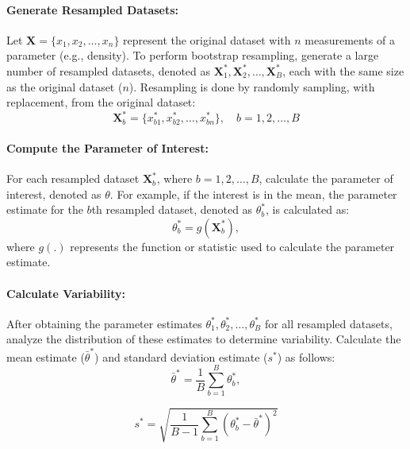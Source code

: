 \documentclass{article}
\begin{document}
\paragraph{Generate Resampled Datasets:}
Let $\mathbf{X} = \{x_1, x_2, \ldots, x_n\}$ represent the original dataset with $n$ measurements of a parameter (e.g., density). To perform bootstrap resampling, generate a large number of resampled datasets, denoted as $\mathbf{X}^{*}_1, \mathbf{X}^{*}_2, \ldots, \mathbf{X}^{*}_B$, each with the same size as the original dataset ($n$). Resampling is done by randomly sampling, with replacement, from the original dataset\cite{Chernick2007BootstrapMA}\cite{davison_hinkley_1997}\cite{Efron1994AnIT}\cite{article}:
\begin{equation}
\mathbf{X}^{*}_b = \{x^{*}_{b1}, x^{*}_{b2}, \ldots, x^{*}_{bn}\}, \quad b = 1, 2, \ldots, B
\end{equation}

\paragraph{Compute the Parameter of Interest:}
For each resampled dataset $\mathbf{X}^{*}_b$, where $b = 1, 2, \ldots, B$, calculate the parameter of interest, denoted as $\theta$. For example, if the interest is in the mean, the parameter estimate for the $b$th resampled dataset, denoted as $\theta^{*}_{b}$, is calculated as\cite{Chernick2007BootstrapMA}\cite{davison_hinkley_1997}\cite{Efron1994AnIT}\cite{article}:
\begin{equation}
\theta^{*}_{b} = g(\mathbf{X}^{*}_b),
\end{equation}
where $g(.)$ represents the function or statistic used to calculate the parameter estimate.
\paragraph{Calculate Variability:}
After obtaining the parameter estimates $\theta^{*}_{1}, \theta^{*}_{2}, \ldots, \theta^{*}_{B}$ for all resampled datasets, analyze the distribution of these estimates to determine variability. Calculate the mean estimate ($\bar{\theta}^{*}$) and standard deviation estimate ($s^{*}$) as follows\cite{Chernick2007BootstrapMA}\cite{Efron1994AnIT}:
\begin{equation}
\bar{\theta}^{*} = \frac{1}{B}\sum_{b=1}^{B}\theta^{*}_{b},
\end{equation}

\begin{equation}
s^{*} = \sqrt{\frac{1}{B-1}\sum_{b=1}^{B}(\theta^{*}_{b} - \bar{\theta}^{*})^2}
\end{equation}
\end{document}
